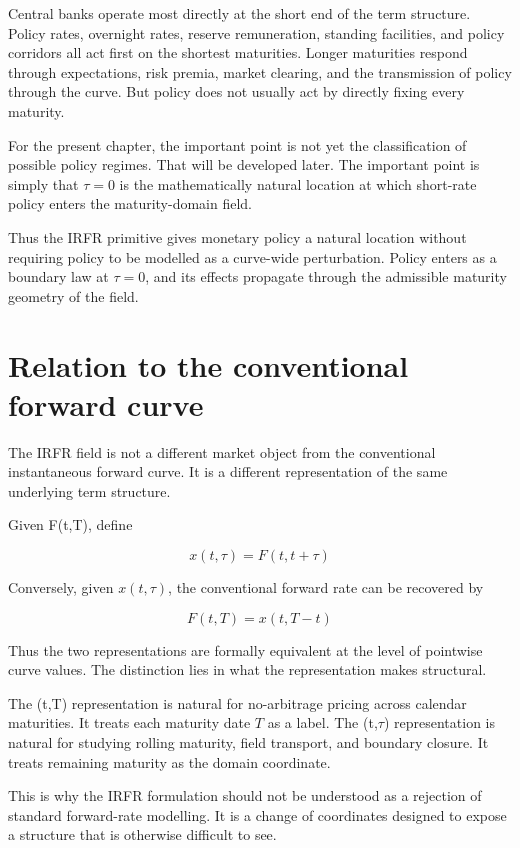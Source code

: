 \documentclass[11pt,oneside]{book}
\begin{document}
Central banks operate most directly at the short end of the term
structure. Policy rates, overnight rates, reserve remuneration, standing
facilities, and policy corridors all act first on the shortest
maturities. Longer maturities respond through expectations, risk premia,
market clearing, and the transmission of policy through the curve. But
policy does not usually act by directly fixing every maturity.

For the present chapter, the important point is not yet the
classification of possible policy regimes. That will be developed later.
The important point is simply that $\tau=0$ is the mathematically natural
location at which short-rate policy enters the maturity-domain field.

Thus the IRFR primitive gives monetary policy a natural location without
requiring policy to be modelled as a curve-wide perturbation. Policy
enters as a boundary law at $\tau=0$, and its effects propagate through the
admissible maturity geometry of the field.

\section{Relation to the conventional forward
curve}\label{relation-to-the-conventional-forward-curve}

The IRFR field is not a different market object from the conventional
instantaneous forward curve. It is a different representation of the
same underlying term structure.

Given F(t,T), define

\[
x(t,\tau) = F(t,t+\tau)
\]

Conversely, given $x(t,\tau)$, the conventional forward rate can be recovered
by

\[
F(t,T) = x(t,T-t)
\]

Thus the two representations are formally equivalent at the level of
pointwise curve values. The distinction lies in what the representation
makes structural.

The (t,T) representation is natural for no-arbitrage pricing across
calendar maturities. It treats each maturity date \(T\) as a label. The
(t,$\tau$) representation is natural for studying rolling maturity, field
transport, and boundary closure. It treats remaining maturity as the
domain coordinate.

This is why the IRFR formulation should not be understood as a rejection
of standard forward-rate modelling. It is a change of coordinates
designed to expose a structure that is otherwise difficult to see.
\end{document}
